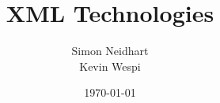 \titlehead{Hochschule Luzern \\
	Technik \& Architektur}
\subject{Zusammenfassung}
\title{XML Technologies}
\subtitle{}
\author{Simon Neidhart \\ Kevin Wespi \\}
\date{\today}

\maketitle
